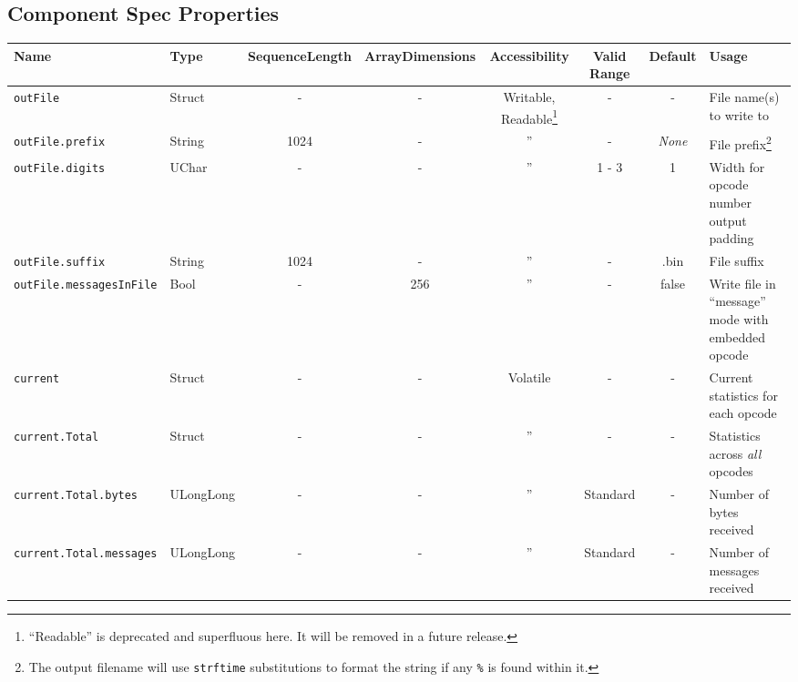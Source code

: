 \documentclass{article}
\begin{document}
\begin{landscape}
  \section*{Component Spec Properties}
  \begin{minipage}{\textwidth}
    \renewcommand*\footnoterule{} %
    \renewcommand{\thempfootnote}{\arabic{mpfootnote}} %
  \begin{scriptsize}
    \begin{tabular}{|p{3cm}|p{1.5cm}|c|c|c|c|c|p{7cm}|}
      \hline
      \rowcolor{blue}
      Name & Type & SequenceLength & ArrayDimensions & Accessibility & Valid Range & Default & Usage \\
      \hline
      \verb+outFile+ & Struct & - & - & Writable, Readable\footnote{``Readable'' is deprecated and superfluous here. It will be removed in a future release.}\setcounter{fnreadable}{\thempfootnote} & - & - &
      File name(s) to write to \\
      \hline
      \verb+outFile.prefix+ & String & 1024 & - & '' & - & \textit{None} &
      File prefix\footnote{\label{strftime}The output filename will use \texttt{strftime} substitutions to format the string if any \texttt{\%} is found within it.} \\
      \hline
      \verb+outFile.digits+ & UChar & - & - & '' & 1 - 3 & 1 &
      Width for opcode number output padding \\
      \hline
      \verb+outFile.suffix+ & String & 1024 & - & '' & - & .bin &
      File suffix \\
      \hline
      \verb+outFile.messagesInFile+ & Bool & - & 256 & '' & - & false &
      Write file in ``message'' mode with embedded opcode \\
      \hline
      \verb+current+ & Struct & - & - & Volatile & - & - &
      Current statistics for each opcode \\
      \hline
      \verb+current.Total+ & Struct & - & - & '' & - & - &
      Statistics across \textit{all} opcodes \\
      \hline
      \verb+current.Total.bytes+ & ULongLong & - & - & '' &
      Standard & - & Number of bytes received \\
      \hline
      \verb+current.Total.messages+ & ULongLong & - & - & '' &
      Standard & - & Number of messages received \\

\end{tabular}
\end{scriptsize}
\end{minipage}
\end{landscape}
\end{document}
